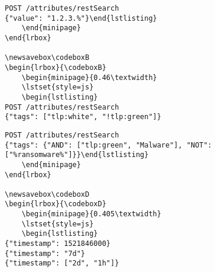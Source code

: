 \documentclass{article}
\begin{document}

\newcommand{\bashcode}[1]{
    \colorbox{gray!20}{\lstinline[language=bash]|#1|}
}
\newcommand{\clicode}[1]{
    \colorbox{gray!20}{\lstinline[language=bash]|MISP/app/Console/cake #1|}
}
\newcommand{\httpcode}[3][]{\colorbox{gray!20}{#2 \lstinline[]|#3|}
    \colorbox{gray!20}{\lstinline[]|#1|}
}

\newsavebox\codeboxA
\begin{lrbox}{\codeboxA}
    \begin{minipage}{0.46\textwidth}
    \lstset{style=js}
    \begin{lstlisting}
POST /attributes/restSearch
{"value": "1.2.3.%"}\end{lstlisting}
    \end{minipage}
\end{lrbox}

\newsavebox\codeboxB
\begin{lrbox}{\codeboxB}
    \begin{minipage}{0.46\textwidth}
    \lstset{style=js}
    \begin{lstlisting}
POST /attributes/restSearch
{"tags": ["tlp:white", "!tlp:green"]}\end{lstlisting}
    \end{minipage}
\end{lrbox}

\newsavebox\codeboxC
\begin{lrbox}{\codeboxC}
    \begin{minipage}{0.46\textwidth}
    \lstset{style=js}
    \begin{lstlisting}
POST /attributes/restSearch
{"tags": {"AND": ["tlp:green", "Malware"], "NOT": ["%ransomware%"]}}\end{lstlisting}
    \end{minipage}
\end{lrbox}

\newsavebox\codeboxD
\begin{lrbox}{\codeboxD}
    \begin{minipage}{0.405\textwidth}
    \lstset{style=js}
    \begin{lstlisting}
{"timestamp": 1521846000}
{"timestamp": "7d"}
{"timestamp": ["2d", "1h"]}\end{lstlisting}
    \end{minipage}
\end{lrbox}
\end{document}
